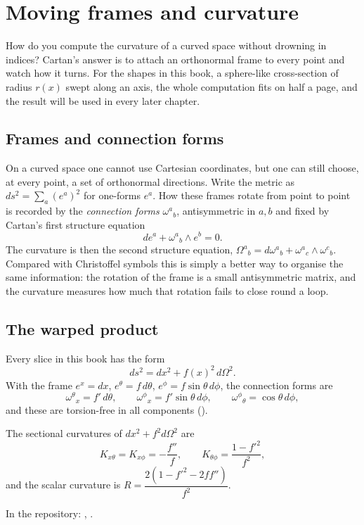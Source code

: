 \chapter{Moving frames and curvature}\label{ch:frames}

\begin{questionbox}
How do you compute the curvature of a curved space without drowning in indices? Cartan's answer is to attach an orthonormal frame to every point and watch how it turns. For the shapes in this book, a sphere-like cross-section of radius $r(x)$ swept along an axis, the whole computation fits on half a page, and the result will be used in every later chapter.
\end{questionbox}

\section{Frames and connection forms}

On a curved space one cannot use Cartesian coordinates, but one can still choose, at every point, a set of orthonormal directions. Write the metric as $ds^2=\sum_a(e^a)^2$ for one-forms $e^a$. How these frames rotate from point to point is recorded by the \emph{connection forms} $\omega^a{}_b$, antisymmetric in $a,b$ and fixed by Cartan's first structure equation
\[
de^a+\omega^a{}_b\wedge e^b=0 .
\]
The curvature is then the second structure equation, $\Omega^a{}_b=d\omega^a{}_b+\omega^a{}_c\wedge\omega^c{}_b$. Compared with Christoffel symbols this is simply a better way to organise the same information: the rotation of the frame is a small antisymmetric matrix, and the curvature measures how much that rotation fails to close round a loop.

\section{The warped product}

Every slice in this book has the form
\[
ds^2=dx^2+f(x)^2\,d\Omega^2 .
\]
With the frame $e^x=dx$, $e^\theta=f\,d\theta$, $e^\phi=f\sin\theta\,d\phi$, the connection forms are
\[
\omega^\theta{}_x=f'\,d\theta,\qquad \omega^\phi{}_x=f'\sin\theta\,d\phi,\qquad \omega^\phi{}_\theta=\cos\theta\,d\phi ,
\]
and these are torsion-free in all components ().

\begin{theorem}\proved\label{thm:warped}
The sectional curvatures of $dx^2+f^2d\Omega^2$ are
\[
K_{x\theta}=K_{x\phi}=-\frac{f''}{f},\qquad K_{\theta\phi}=\frac{1-f'^2}{f^2},
\]
and the scalar curvature is $R=\dfrac{2(1-f'^2-2ff'')}{f^2}$.
\end{theorem}
\noindent In the repository: , .

